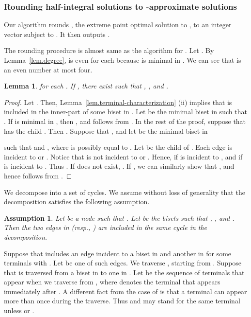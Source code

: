 \documentclass{article}
\newtheorem{lemma}{Lemma}
\newtheorem{assumption}{Assumption}
\begin{document}
\subsubsection*{Rounding half-integral solutions to -approximate solutions}
Our algorithm rounds , the extreme point optimal solution
to ,
to an integer vector 
subject to .
It then outputs .

The rounding procedure
is almost same as the algorithm for .
Let .
By Lemma~\ref{lem.degree},  is even for each  because
 is minimal in .
We can see that  is an even number at most four.

\begin{lemma}
  for each .
 If , there exist 
 such that , ,
 and .
\end{lemma}
\begin{proof}
 Let . Then,
 Lemma~\ref{lem.terminal-characterization} (ii) implies that
  is included in the inner-part of some biset in .
 Let  be the minimal biset in  such that .
 If  is minimal in ,
 then , and
  follows from .
 In the rest of the proof, suppose that
   has the child .
 Then .
 Suppose that , and let  be the minimal biset in
 
 such that  and ,
 where  is
 possibly equal to .
 Let  be the child of .
 Each edge   is incident to  or .
 Notice that  is not incident to  or .
 Hence,
  if  is incident to , 
 and  if  is incident to .
 Thus .
 If  does not exist,
 .
 If , we can similarly show that , and hence
  follows from
 .
\end{proof}

We decompose  into a set of cycles.
We assume without loss of generality that the decomposition satisfies
the following assumption.

 \begin{assumption}
  \label{assump.cycle}
 Let  be a node such that . Let  be the bisets such that , , and
 .
  Then the two edges in 
  {\rm (}resp., {\rm )}
  are included in the same cycle in the decomposition.
   \end{assumption}

  Suppose that  includes an edge incident to a biset in
   and another in  for some terminals
   with .
   Let  be one of such edges.
   We traverse , starting from .
   Suppose that  is traversed from a biset in  to one in
   .
   Let  be the
   sequence of terminals that appear when we traverse  from ,
   where  denotes the terminal that appears immediately after .
   A different fact from the case of  is that
   a terminal can appear more than once during the traverse.
   Thus  and  may stand for the same terminal unless  or .
\end{document}
